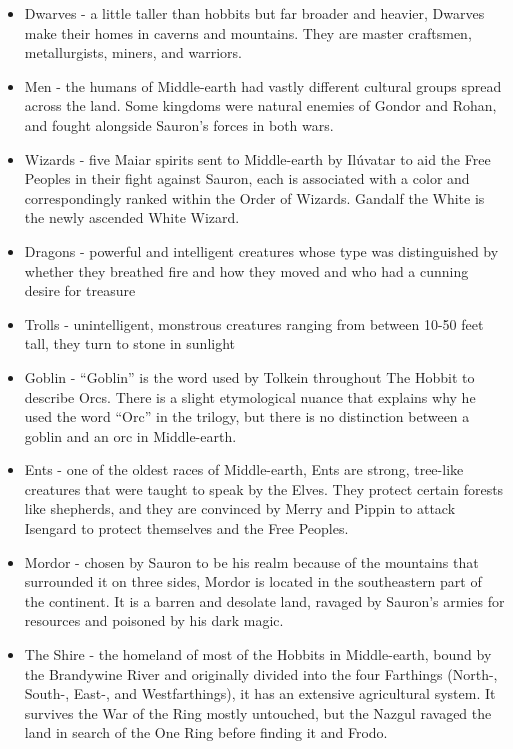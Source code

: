 \documentclass[10pt, letterpaper]{article}
\begin{document}
\begin{itemize}
    \item {Dwarves - a little taller than hobbits but far broader and heavier, Dwarves make their homes in caverns and mountains. They are master craftsmen, metallurgists, miners, and warriors.}
    
    \item {Men - the humans of Middle-earth had vastly different cultural groups spread across the land. Some kingdoms were natural enemies of Gondor and Rohan, and fought alongside Sauron’s forces in both wars.}
    
    \item {Wizards - five Maiar spirits sent to Middle-earth by Ilúvatar to aid the Free Peoples in their fight against Sauron, each is associated with a color and correspondingly ranked within the Order of Wizards. Gandalf the White is the newly ascended White Wizard.}
    
    \item {Dragons - powerful and intelligent creatures whose type was distinguished by whether they breathed fire and how they moved and who had a cunning desire for treasure}
    
    \item {Trolls - unintelligent, monstrous creatures ranging from between 10-50 feet tall, they turn to stone in sunlight}
    
    \item {Goblin - “Goblin” is the word used by Tolkein throughout The Hobbit to describe Orcs. There is a slight etymological nuance that explains why he used the word “Orc” in the trilogy, but there is no distinction between a goblin and an orc in Middle-earth.}
    
    \item {Ents - one of the oldest races of Middle-earth, Ents are strong, tree-like creatures that were taught to speak by the Elves. They protect certain forests like shepherds, and they are convinced by Merry and Pippin to attack Isengard to protect themselves and the Free Peoples. }
    
    \item {Mordor - chosen by Sauron to be his realm because of the mountains that surrounded it on three sides, Mordor is located in the southeastern part of the continent. It is a barren and desolate land, ravaged by Sauron’s armies for resources and poisoned by his dark magic. }
    
    \item {The Shire - the homeland of most of the Hobbits in Middle-earth, bound by the Brandywine River and originally divided into the four Farthings (North-, South-, East-, and Westfarthings), it has an extensive agricultural system. It survives the War of the Ring mostly untouched, but the Nazgul ravaged the land in search of the One Ring before finding it and Frodo.}
\end{itemize}
\end{document}
